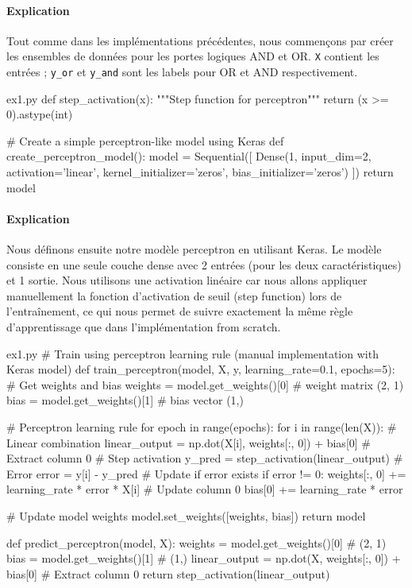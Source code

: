 \documentclass[12pt,a4paper]{article}
\begin{document}
\paragraph{Explication}
Tout comme dans les implémentations précédentes, nous commençons par créer les ensembles de données pour les portes logiques AND et OR.
\texttt{X} contient les entrées ; \texttt{y\_or} et \texttt{y\_and} sont les labels pour OR et AND respectivement.


\begin{codeholder}{ex1.py}
def step_activation(x):
    """Step function for perceptron"""
    return (x >= 0).astype(int)

# Create a simple perceptron-like model using Keras
def create_perceptron_model():
    model = Sequential([
        Dense(1, input_dim=2, activation='linear', 
              kernel_initializer='zeros', bias_initializer='zeros')
    ])
    return model
\end{codeholder}

\paragraph{Explication}
Nous définons ensuite notre modèle perceptron en utilisant Keras. Le modèle consiste en une seule couche dense avec 2 entrées (pour les deux caractéristiques) et 1 sortie.
Nous utilisons une activation linéaire car nous allons appliquer manuellement la fonction d'activation de seuil (step function) lors de l'entraînement,
ce qui nous permet de suivre exactement la même règle d'apprentissage que dans l'implémentation from scratch.


\begin{codeholder}{ex1.py}
# Train using perceptron learning rule (manual implementation with Keras model)
def train_perceptron(model, X, y, learning_rate=0.1, epochs=5):
    # Get weights and bias
    weights = model.get_weights()[0]  # weight matrix (2, 1)
    bias = model.get_weights()[1]     # bias vector (1,)
    
    # Perceptron learning rule
    for epoch in range(epochs):
        for i in range(len(X)):
            # Linear combination
            linear_output = np.dot(X[i], weights[:, 0]) + bias[0]  # Extract column 0
            # Step activation
            y_pred = step_activation(linear_output)
            # Error
            error = y[i] - y_pred
            # Update if error exists
            if error != 0:
                weights[:, 0] += learning_rate * error * X[i]  # Update column 0
                bias[0] += learning_rate * error
    
    # Update model weights
    model.set_weights([weights, bias])
    return model

def predict_perceptron(model, X):
    weights = model.get_weights()[0]  # (2, 1)
    bias = model.get_weights()[1]     # (1,)
    linear_output = np.dot(X, weights[:, 0]) + bias[0]  # Extract column 0
    return step_activation(linear_output)
\end{codeholder}
\end{document}
